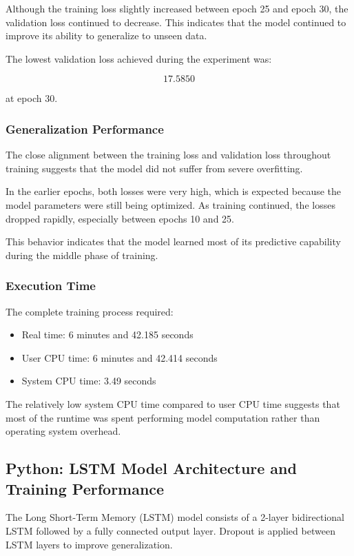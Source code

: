 \documentclass{ieeeaccess}
\begin{document}
Although the training loss slightly increased between epoch 25 and epoch 30, the validation loss continued to decrease. This indicates that the model continued to improve its ability to generalize to unseen data.

The lowest validation loss achieved during the experiment was:

\[
17.5850
\]

at epoch 30.

\subsubsection{Generalization Performance}

The close alignment between the training loss and validation loss throughout training suggests that the model did not suffer from severe overfitting.

In the earlier epochs, both losses were very high, which is expected because the model parameters were still being optimized. As training continued, the losses dropped rapidly, especially between epochs 10 and 25.

This behavior indicates that the model learned most of its predictive capability during the middle phase of training.

\subsubsection{Execution Time}

The complete training process required:

\begin{itemize}
    \item Real time: 6 minutes and 42.185 seconds
    \item User CPU time: 6 minutes and 42.414 seconds
    \item System CPU time: 3.49 seconds
\end{itemize}

The relatively low system CPU time compared to user CPU time suggests that most of the runtime was spent performing model computation rather than operating system overhead.
\subsection{Python: LSTM Model Architecture and Training Performance}

The Long Short-Term Memory (LSTM) model consists of a 2-layer bidirectional LSTM followed by a fully connected output layer. Dropout is applied between LSTM layers to improve generalization.
\end{document}
